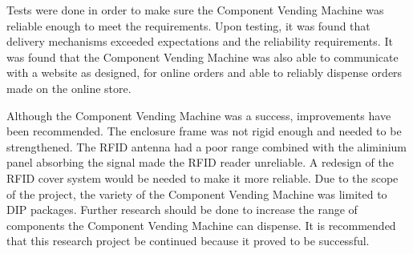 \documentclass[a4paper,11pt]{article}
\numberwithin{figure}{section}
\numberwithin{table}{section}
\begin{document}
Tests were done in order to make sure the Component Vending Machine was reliable enough to meet the requirements. Upon testing, it was found that delivery mechanisms exceeded expectations and the reliability requirements. It was found that the Component Vending Machine was also able to communicate with a website as designed, for online orders and able to reliably dispense orders made on the online store.

Although the Component Vending Machine was a success, improvements have been recommended. The enclosure frame was not rigid enough and needed to be strengthened. The RFID antenna had a poor range combined with the aliminium panel absorbing the signal made the RFID reader unreliable. A redesign of the RFID cover system would be needed to make it more reliable. Due to the scope of the project, the variety of the Component Vending Machine was limited to DIP packages. Further research should be done to increase the range of components the Component Vending Machine can dispense. It is recommended that this research project be continued because it proved to be successful.
	
	\newpage	
	\tableofcontents
	\newpage
	\listoffigures
	\newpage
	\listoftables
	\newpage
	
	\mbox{}
	\printnomenclature[2cm]	
	
\end{document}
